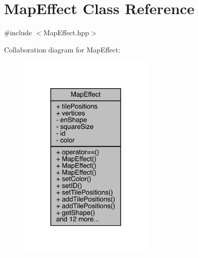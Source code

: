 \hypertarget{class_map_effect}{}\section{Map\+Effect Class Reference}
\label{class_map_effect}


{\ttfamily \#include $<$Map\+Effect.\+hpp$>$}



Collaboration diagram for Map\+Effect\+:
\nopagebreak
\begin{figure}[H]
\begin{center}
\leavevmode
\includegraphics[width=184pt]{d8/d21/class_map_effect__coll__graph}
\end{center}
\end{figure}
